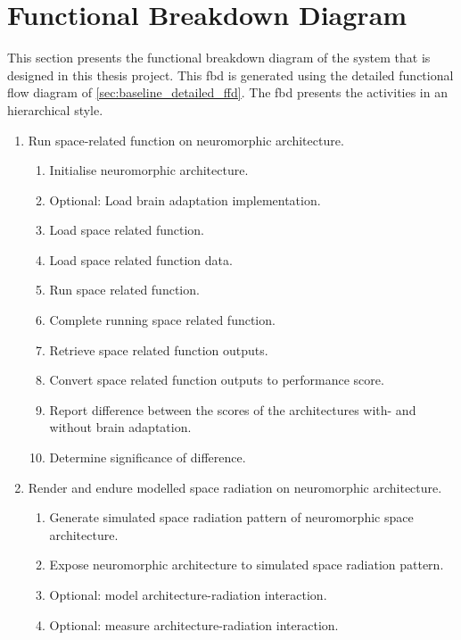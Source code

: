 \chapter{Functional Breakdown Diagram}\label{chap:baseline_fbd}
This section presents the functional breakdown diagram of the system that is designed in this thesis project. This \acrshort{fbd} is generated using the detailed functional flow diagram of \cref{sec:baseline_detailed_ffd}. The \acrshort{fbd} presents the activities in an hierarchical style.

\begin{enumerate}
    \item Run space-related function on neuromorphic architecture.
    \begin{enumerate}
        \item Initialise neuromorphic architecture.
        \item Optional: Load brain adaptation implementation.
        \item Load space related function.
        \item Load space related function data.
        \item Run space related function.
        \item Complete running space related function.
        \item Retrieve space related function outputs.
        \item Convert space related function outputs to performance score.
        \item Report difference between the scores of the architectures with- and without brain adaptation.
        \item Determine significance of difference.
    \end{enumerate}
    \item Render and endure modelled space radiation on neuromorphic architecture.
    \begin{enumerate}
        \item Generate simulated space radiation pattern of neuromorphic space architecture.
        \item Expose neuromorphic architecture to simulated space radiation pattern.
        \item Optional: model architecture-radiation interaction.
        \item Optional: measure architecture-radiation interaction.
    \end{enumerate}
\end{enumerate}